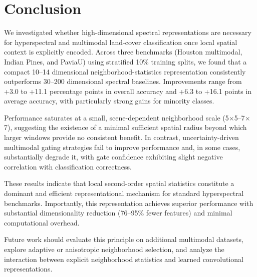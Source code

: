 \documentclass[
  journal]{IEEEtran}
\begin{document}
\section{Conclusion}\label{conclusion}

We investigated whether high-dimensional spectral representations are
necessary for hyperspectral and multimodal land-cover classification
once local spatial context is explicitly encoded. Across three
benchmarks (Houston multimodal, Indian Pines, and PaviaU) using
stratified 10\% training splits, we found that a compact 10--14
dimensional neighborhood-statistics representation consistently
outperforms 30--200 dimensional spectral baselines. Improvements range
from +3.0 to +11.1 percentage points in overall accuracy and +6.3 to
+16.1 points in average accuracy, with particularly strong gains for
minority classes.

Performance saturates at a small, scene-dependent neighborhood scale
(5\(\times\)5--7\(\times\)7), suggesting the existence of a minimal sufficient spatial
radius beyond which larger windows provide no consistent benefit. In
contrast, uncertainty-driven multimodal gating strategies fail to
improve performance and, in some cases, substantially degrade it, with
gate confidence exhibiting slight negative correlation with
classification correctness.

These results indicate that local second-order spatial statistics
constitute a dominant and efficient representational mechanism for
standard hyperspectral benchmarks. Importantly, this representation
achieves superior performance with substantial dimensionality reduction
(76--95\% fewer features) and minimal computational overhead.

Future work should evaluate this principle on additional multimodal
datasets, explore adaptive or anisotropic neighborhood selection, and
analyze the interaction between explicit neighborhood statistics and
learned convolutional representations.
\end{document}
